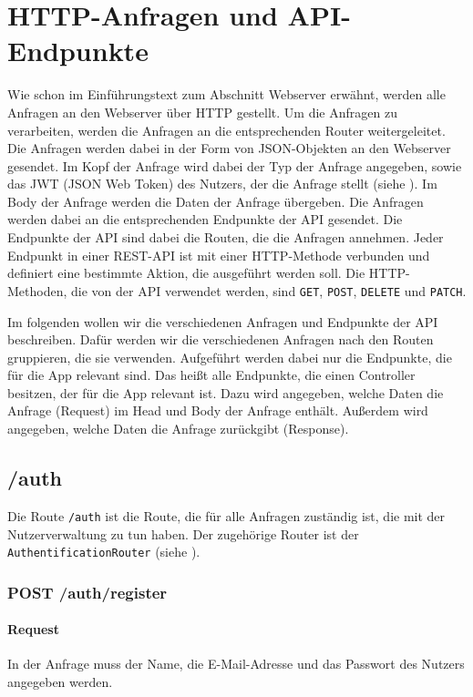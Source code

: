 \documentclass{entwurfsheft}
\begin{document}
\section{HTTP-Anfragen und API-Endpunkte} \label{sec:HTTP-Anfragen und API-Endpunkte}
Wie schon im Einführungstext zum Abschnitt Webserver erwähnt, werden alle Anfragen an den Webserver über HTTP gestellt.
Um die Anfragen zu verarbeiten, werden die Anfragen an die entsprechenden Router weitergeleitet.
Die Anfragen werden dabei in der Form von JSON-Objekten an den Webserver gesendet.
Im Kopf der Anfrage wird dabei der Typ der Anfrage angegeben, sowie das JWT (JSON Web Token) des Nutzers, der die Anfrage stellt (siehe ).
Im Body der Anfrage werden die Daten der Anfrage übergeben.
Die Anfragen werden dabei an die entsprechenden Endpunkte der API gesendet.
Die Endpunkte der API sind dabei die Routen, die die Anfragen annehmen.
Jeder Endpunkt in einer REST-API ist mit einer HTTP-Methode verbunden und definiert eine bestimmte Aktion, die ausgeführt werden soll.
Die HTTP-Methoden, die von der API verwendet werden, sind \texttt{GET}, \texttt{POST}, \texttt{DELETE} und \texttt{PATCH}.

Im folgenden wollen wir die verschiedenen Anfragen und Endpunkte der API beschreiben.
Dafür werden wir die verschiedenen Anfragen nach den Routen gruppieren, die sie verwenden.
Aufgeführt werden dabei nur die Endpunkte, die für die App relevant sind. 
Das heißt alle Endpunkte, die einen Controller besitzen, der für die App relevant ist.
Dazu wird angegeben, welche Daten die Anfrage (Request) im Head und Body der Anfrage enthält.
Außerdem wird angegeben, welche Daten die Anfrage zurückgibt (Response).

\subsection{/auth}
Die Route \texttt{/auth} ist die Route, die für alle Anfragen zuständig ist, die mit der Nutzerverwaltung zu tun haben.
Der zugehörige Router ist der \texttt{AuthentificationRouter} (siehe ).

\subsubsection*{POST /auth/register}
\paragraph{Request}
In der Anfrage muss der Name, die E-Mail-Adresse und das Passwort des Nutzers angegeben werden.
\end{document}
